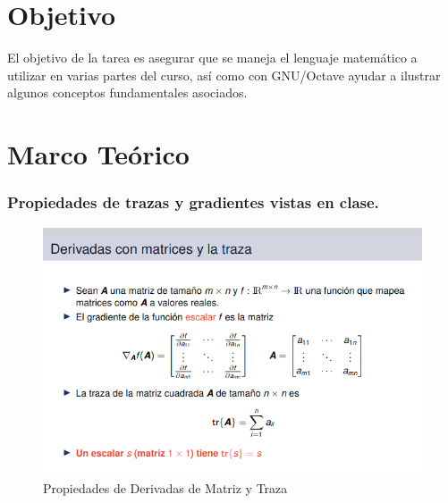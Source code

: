 \documentclass[12pt,letterpaper]{article}
\begin{document}

\section{Objetivo}
El objetivo de la tarea es asegurar que se maneja el lenguaje matemático a utilizar en varias partes
del curso, así como con GNU/Octave ayudar a ilustrar algunos conceptos fundamentales asociados.

\section{Marco Teórico}

\subsubsection{Propiedades de trazas y gradientes vistas en clase.}

\begin{figure}[H]
    \centering
    \includegraphics[scale=0.55]{A&A_GAF_HW01/fig/A&A_HW01_01.png}
    \caption{Propiedades de Derivadas de Matriz y Traza \cite{Teoría3.1_p35} } 
    \label{fig:MV4}
\end{figure}
\end{document}
